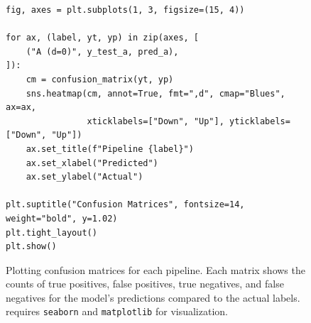 %
%

\begin{figure}[ht]
\centering
\begin{verbatim}
fig, axes = plt.subplots(1, 3, figsize=(15, 4))

for ax, (label, yt, yp) in zip(axes, [
    ("A (d=0)", y_test_a, pred_a),
]):
    cm = confusion_matrix(yt, yp)
    sns.heatmap(cm, annot=True, fmt=",d", cmap="Blues", ax=ax,
                xticklabels=["Down", "Up"], yticklabels=["Down", "Up"])
    ax.set_title(f"Pipeline {label}")
    ax.set_xlabel("Predicted")
    ax.set_ylabel("Actual")

plt.suptitle("Confusion Matrices", fontsize=14, weight="bold", y=1.02)
plt.tight_layout()
plt.show()
\end{verbatim}
\caption{Plotting confusion matrices for each pipeline. Each matrix shows the counts of true positives, false positives, true negatives, and false negatives for the model's predictions compared to the actual labels.
requires \texttt{seaborn} and \texttt{matplotlib} for visualization.}
\label{lst:Python-Confusion-Matrix}
\end{figure}